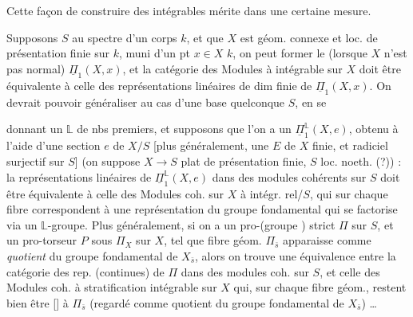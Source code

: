 \documentclass[11pt,a4paper]{article}
\begin{document}

Cette façon de construire des  
intégrables mérite  \struck{\ill{}}  \ill{}
 dans une certaine mesure.
 

Supposons $S$  au spectre d'un corps $k$, et que $X$ est
géom. connexe et loc. de présentation finie sur $k$, muni d'un pt $x\in X$
\struck{\ill{}}  $k$, on peut former le
  (lorsque $X$ n'est pas
normal)  $\underline{\Pi}_1(X,x)$, et la catégorie des
Modules à  intégrable sur $X$ doit être
équivalente à celle des représentations linéaires de dim finie de
$\underline{\Pi}_1(X,x)$. On devrait pouvoir généraliser au cas d'une base
quelconque $S$, en se

donnant un  $\mathbb{L}$ de nbs premiers, et supposons
que l'on a un \struck{\ill{}} 
$\underline{\Pi}_1^{\mathbb{L}}(X,e)$, obtenu à l'aide d'une section $e$ de
$X/S$ [plus généralement, une  $E$ de $X$ finie, et
radiciel surjectif sur $S$] (on suppose $X\to S$ plat de présentation finie,
 $S$ loc. noeth. (?)) : la 
représentations linéaires de $\underline{\Pi}_1^{\mathbb{L}}(X,e)$ dans des
modules cohérents sur $S$ doit être équivalente à celle des
 Modules coh. sur $X$ à  
intégr. rel/$S$, qui sur chaque fibre  correspondent à une
représentation du groupe fondamental qui  se factorise via un
$\mathbb{L}$-groupe. Plus généralement, si on a un 
pro-(groupe \struck{\ill{}} ) 
strict $\Pi$ sur $S$, et un pro-torseur $P$ sous $\Pi_X$ sur $X$, tel que
 fibre géom.  $\Pi_{\bar{s}}$ apparaisse comme
\emph{quotient} du groupe fondamental  de $X_{\bar{s}}$, alors
on  trouve une équivalence entre la catégorie des
rep. (continues) de $\Pi$ dans des modules coh. sur $S$, et celle des Modules
coh. à stratification intégrable sur $X$ qui, sur chaque fibre géom., restent
bien être \uncertain{\ill{}} [] à $\Pi_{\bar{s}}$
(regardé comme quotient du groupe fondamental de $X_{\bar{s}}$) …
\end{document}
